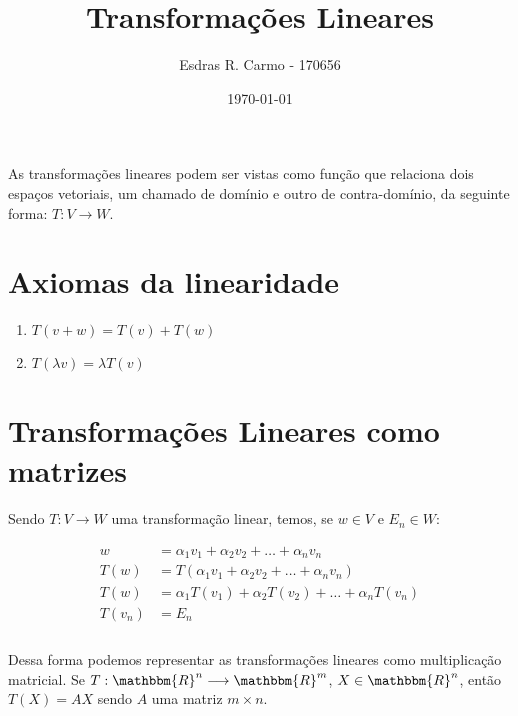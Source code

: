 \documentclass{article}
\author{Esdras R. Carmo - 170656}
\title{Transformações Lineares}
\date{\today}
\newcommand{\REAL} {\mathbbm{R}}
\begin{document}
    \maketitle
    \paragraph{}
    As transformações lineares podem ser vistas como função que relaciona dois espaços vetoriais,
    um chamado de domínio e outro de contra-domínio, da seguinte forma: $T: V \longrightarrow W$.

    \section{Axiomas da linearidade}
        \begin{enumerate}
            \item $T(v + w) = T(v) + T(w)$
            \item $T(\lambda v) = \lambda T(v)$
        \end{enumerate}

    \section{Transformações Lineares como matrizes}
        \paragraph{}
        Sendo $T: V \longrightarrow W$ uma transformação linear, temos, se $w \in V$ e $E_n \in W$:

        \begin{align*}
            w &= \alpha_1 v_1 + \alpha_2 v_2 + \dots + \alpha_n v_n\\
            T(w) &= T(\alpha_1 v_1 + \alpha_2 v_2 + \dots + \alpha_n v_n)\\
            T(w) &= \alpha_1 T(v_1) + \alpha_2 T(v_2) + \dots + \alpha_n T(v_n)\\
            T(v_n) &= E_n\\
        \end{align*}

        \paragraph{}
        Dessa forma podemos representar as transformações lineares como multiplicação matricial.
        Se $T: \REAL^n \longrightarrow \REAL^m$, $X \in \REAL^n$, então $T(X) = AX$ sendo $A$ uma
        matriz $m \times n$.
\end{document}
